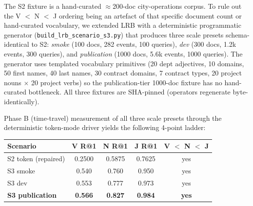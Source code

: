 \documentclass[11pt,a4paper]{article}
\begin{document}
The S2 fixture is a hand-curated $\approx$200-doc city-operations corpus. To rule out the V $<$ N $<$ J ordering being an artefact of that specific document count or hand-curated vocabulary, we extended LRB with a deterministic programmatic generator (\texttt{build\_lrb\_scenario\_s3.py}) that produces three scale presets schema-identical to S2: \emph{smoke} (100 docs, 282 events, 100 queries), \emph{dev} (300 docs, 1.2k events, 300 queries), and \emph{publication} (1000 docs, 5.6k events, 1000 queries). The generator uses templated vocabulary primitives (20 dept adjectives, 10 domains, 50 first names, 40 last names, 30 contract domains, 7 contract types, 20 project nouns $\times$ 20 project verbs) so the publication-tier 1000-doc fixture has no hand-curated bottleneck. All three fixtures are SHA-pinned (operators regenerate byte-identically).

Phase B (time-travel) measurement of all three scale presets through the deterministic token-mode driver yields the following 4-point ladder:

\begin{center}
\begin{tabular}{lccc|c}
\toprule
Scenario & V R@1 & N R@1 & J R@1 & V $<$ N $<$ J \\
\midrule
S2 token (repaired)   & 0.2500 & 0.5875 & 0.7625 & yes \\
S3 smoke              & 0.540 & 0.760 & 0.950 & yes \\
S3 dev                & 0.553 & 0.777 & 0.973 & yes \\
\textbf{S3 publication} & \textbf{0.566} & \textbf{0.827} & \textbf{0.984} & \textbf{yes} \\
\bottomrule
\end{tabular}
\end{center}
\end{document}
